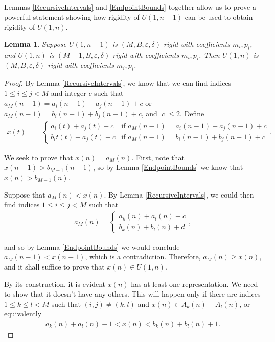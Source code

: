 \documentclass{amsart}
\theoremstyle{theorem}
\newtheorem{lemma}{Lemma}[section]
\theoremstyle{definition}
\begin{document}
Lemmas \ref{RecursiveIntervals} and \ref{EndpointBounds} together allow us to prove a powerful statement showing how rigidity of $U(1,n - 1)$ can be used to obtain rigidity of $U(1,n)$.

\begin{lemma}\label{OneElementRigidity}
Suppose $U(1,n - 1)$ is $(M,B,\varepsilon,\delta)$-rigid with coefficients $m_i, p_i$, and $U(1,n)$ is $(M - 1,B,\varepsilon,\delta)$-rigid with coefficients $m_i, p_i$. Then $U(1,n)$ is $(M,B,\varepsilon,\delta)$-rigid with coefficients $m_i, p_i$.
\end{lemma}

\begin{proof}
By Lemma \ref{RecursiveIntervals}, we know that we can find indices $1 \leq i\leq j < M$ and integer $c$ such that $a_M(n - 1) = a_i(n - 1) + a_j(n - 1) + c$ or $a_M(n - 1) = b_i(n - 1) + b_j(n - 1) + c$, and $|c| \leq 2$. Define
	\begin{align*}
    x(t) &= \begin{cases} a_i(t) + a_j(t) + c & \text{if } a_M(n - 1) = a_i(n - 1) + a_j(n - 1) + c \\ b_it(t) + a_j(t) + c & \text{if } a_M(n - 1) = b_i(n - 1) + b_j(n - 1) + c \end{cases}.
    \end{align*}
    
\noindent We seek to prove that $x(n) = a_M(n)$. First, note that $x(n - 1) > b_{M - 1}(n - 1)$, so by Lemma \ref{EndpointBounds} we know that $x(n) > b_{M - 1}(n)$.

Suppose that $a_M(n) < x(n)$. By Lemma \ref{RecursiveIntervals}, we could then find indices $1 \leq i\leq j < M$ such that
	\begin{align*}
    a_M(n) = \begin{cases} a_k(n) + a_l(n) + c \\ b_k(n) + b_l(n) + d \end{cases},
    \end{align*}
    
\noindent and so by Lemma \ref{EndpointBounds} we would conclude $a_M(n - 1) < x(n - 1)$, which is a contradiction. Therefore, $a_M(n) \geq x(n)$, and it shall suffice to prove that $x(n) \in U(1,n)$.

By its construction, it is evident $x(n)$ has at least one representation. We need to show that it doesn't have any others. This will happen only if there are indices $1 \leq k \leq l < M$ such that $(i,j) \neq (k,l)$ and $x(n) \in A_k(n) + A_l(n)$, or equivalently
	\begin{align*}
    a_k(n) + a_l(n) - 1 < x(n) < b_k(n) + b_l(n) + 1.
    \end{align*}
    

\end{proof}
\end{document}
